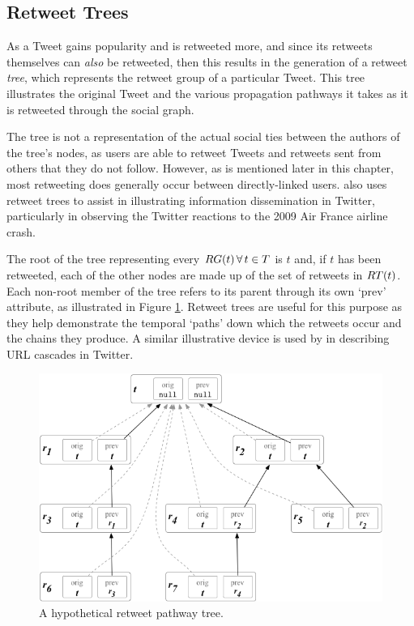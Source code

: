 \subsection{Retweet Trees}
As a Tweet gains popularity and is retweeted more, and since its retweets themselves can \textit{also} be retweeted, then this results in the generation of a retweet \textit{tree}, which represents the retweet group of a particular Tweet. This tree illustrates the original Tweet and the various propagation pathways it takes as it is retweeted through the social graph. 

The tree is not a representation of the actual social ties between the authors of the tree's nodes, as users are able to retweet Tweets and retweets sent from others that they do not follow. However, as is mentioned later in this chapter, most retweeting does generally occur between directly-linked users. \cite{kwak10} also uses retweet trees to assist in illustrating information dissemination in Twitter, particularly in observing the Twitter reactions to the 2009 Air France airline crash.

The root of the tree representing every $RG(t) \, \forall \, t \in T$ is $t$ and, if $t$ has been retweeted, each of the other nodes are made up of the set of retweets in $RT(t)$. Each non-root member of the tree refers to its parent through its own `$\textrm{prev}$' attribute, as illustrated in Figure \ref{fig:retweet_tree}. Retweet trees are useful for this purpose as they help demonstrate the temporal `paths' down which the retweets occur and the chains they produce. A similar illustrative device is used by \citet{galuba10} in describing URL cascades in Twitter.

\begin{figure}[h]
\centering
\includegraphics[scale=0.6]{3.Chapter1/Media/tree.png} 
\caption{A hypothetical retweet pathway tree.}
\label{fig:retweet_tree}
\end{figure}

